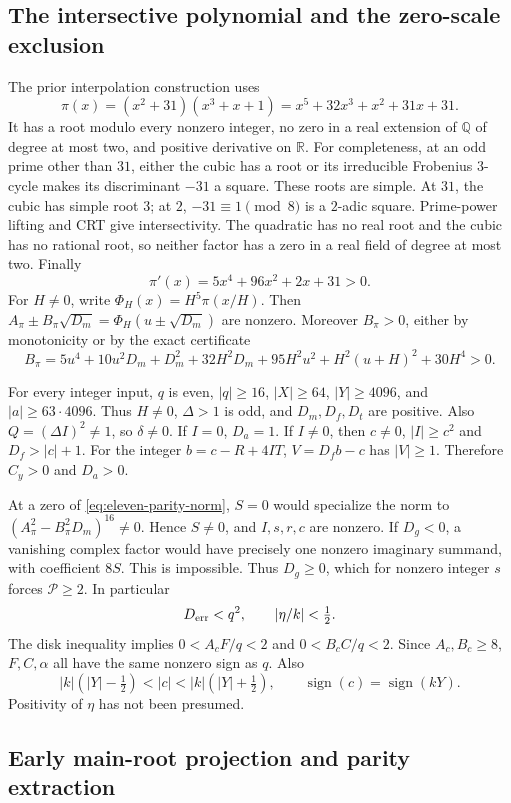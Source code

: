 \subsection{The intersective polynomial and the zero-scale exclusion}

The prior interpolation construction uses
\[
 \pi(x)=(x^2+31)(x^3+x+1)
       =x^5+32x^3+x^2+31x+31.
\]
It has a root modulo every nonzero integer, no zero in a real extension
of $\mathbb Q$ of degree at most two, and positive derivative on
$\mathbb R$. For completeness, at an odd prime other than $31$, either
the cubic has a root or its irreducible Frobenius $3$-cycle makes its
discriminant $-31$ a square. These roots are simple. At $31$, the cubic
has simple root $3$; at $2$, $-31\equiv1\pmod8$ is a $2$-adic square.
Prime-power lifting and CRT give intersectivity. The quadratic has no
real root and the cubic has no rational root, so neither factor has a
zero in a real field of degree at most two. Finally
\[
 \pi'(x)=5x^4+96x^2+2x+31>0.
\]
For $H\ne0$, write $\Phi_H(x)=H^5\pi(x/H)$. Then
$A_\pi\pm B_\pi\sqrt{D_m}=\Phi_H(u\pm\sqrt{D_m})$ are nonzero.
Moreover $B_\pi>0$, either by monotonicity or by the exact certificate
\[
 B_\pi=5u^4+10u^2D_m+D_m^2+32H^2D_m
       +95H^2u^2+H^2(u+H)^2+30H^4>0.
\]

For every integer input, $q$ is even, $|q|\ge16$, $|X|\ge64$,
$|Y|\ge4096$, and $|a|\ge63\cdot4096$. Thus $H\ne0$,
$\Delta>1$ is odd, and $D_m,D_f,D_t$ are positive. Also
$Q=(\Delta I)^2\ne1$, so $\delta\ne0$. If $I=0$, $D_a=1$.
If $I\ne0$, then $c\ne0$, $|I|\ge c^2$ and $D_f>|c|+1$.
For the integer $b=c-R+4IT$, $V=D_fb-c$ has $|V|\ge1$.
Therefore $C_y>0$ and $D_a>0$.

At a zero of \eqref{eq:eleven-parity-norm}, $S=0$ would specialize the
norm to $(A_\pi^2-B_\pi^2D_m)^{16}\ne0$. Hence $S\ne0$, and
$I,s,r,c$ are nonzero. If $D_g<0$, a vanishing complex factor would
have precisely one nonzero imaginary summand, with coefficient $8S$.
This is impossible. Thus $D_g\ge0$, which for nonzero integer $s$
forces $\mathcal P\ge2$. In particular
\[
 D_{\rm err}<q^2,\qquad |\eta/k|<\tfrac12.
\]
The disk inequality implies $0<A_cF/q<2$ and $0<B_cC/q<2$.
Since $A_c,B_c\ge8$, $F,C,\alpha$ all have the same nonzero sign as
$q$. Also
\[
 |k|(|Y|-\tfrac12)<|c|<|k|(|Y|+\tfrac12),
 \qquad \operatorname{sign}(c)=\operatorname{sign}(kY).
\]
Positivity of $\eta$ has not been presumed.

\subsection{Early main-root projection and parity extraction}

